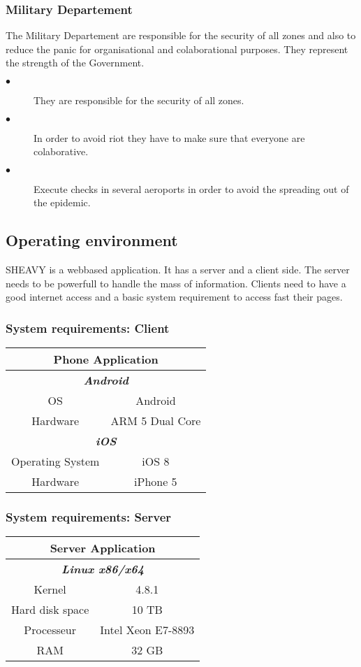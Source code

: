 \subsubsection{Military Departement}
The Military Departement are responsible for the security of all zones and also
to reduce the panic for organisational and colaborational purposes. They
represent the strength of the Government.\\
\begin{description} 
 \item[$\bullet$]They are responsible for the security of all zones.
 \item[$\bullet$]In order to avoid riot they have to make sure that everyone are
 colaborative. 
 \item[$\bullet$]Execute checks in several aeroports in order to avoid the
 spreading out of the epidemic.
\end{description}  

\subsection{Operating environment}
SHEAVY is a webbased application. It has a server and a client side. The server
needs to be powerfull to handle the mass of information. Clients need to have a
good internet access and a basic system requirement to access fast their
pages.\\

\subsubsection{System requirements: Client}
\begin{tabular}{|c|c|}
\hline
\multicolumn{2}{|c|}{\textbf{Phone Application}} \\
\hline
\multicolumn{2}{|c|}{\textit{\textbf{Android}}} \\
\hline
OS & Android \\
\hline
Hardware & ARM 5 Dual Core \\
\hline
\multicolumn{2}{|c|}{\textit{\textbf{iOS}}} \\
\hline
Operating System & iOS 8 \\
\hline
Hardware & iPhone 5 \\
\hline
\end{tabular}

\subsubsection{System requirements: Server}
\begin{tabular}{|c|c|}
\hline
\multicolumn{2}{|c|}{\textbf{Server Application}} \\
\hline
\multicolumn{2}{|c|}{\textit{\textbf{Linux x86/x64}}} \\
\hline
Kernel & 4.8.1 \\
\hline
Hard disk space & 10 TB   \\
\hline
Processeur & Intel Xeon E7-8893 \\
\hline
RAM & 32 GB \\
\hline
\end{tabular}

